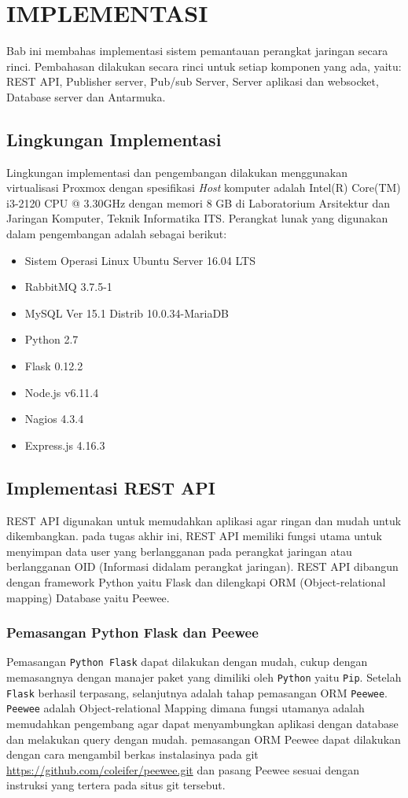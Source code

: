 \chapter{IMPLEMENTASI}
	Bab ini membahas implementasi sistem pemantauan perangkat jaringan secara rinci. Pembahasan dilakukan secara rinci untuk setiap komponen yang ada, yaitu: REST API, Publisher server, Pub/sub Server, Server aplikasi dan websocket, Database server dan Antarmuka.
    
    \section{Lingkungan Implementasi}
    	Lingkungan implementasi dan pengembangan dilakukan menggunakan virtualisasi Proxmox dengan spesifikasi \textit{Host} komputer adalah Intel(R) Core(TM) i3-2120 CPU @ 3.30GHz dengan memori 8 GB di Laboratorium Arsitektur dan Jaringan Komputer, Teknik Informatika ITS. Perangkat lunak yang digunakan dalam pengembangan adalah sebagai berikut:
        \begin{itemize}
        \item Sistem Operasi Linux Ubuntu Server 16.04 LTS
        \item RabbitMQ 3.7.5-1
        \item MySQL Ver 15.1 Distrib 10.0.34-MariaDB
        \item Python 2.7
        \item Flask 0.12.2
        \item Node.js v6.11.4
        \item Nagios 4.3.4
        \item Express.js 4.16.3
        \end{itemize}
        
	\section{Implementasi REST API}
    	REST API digunakan untuk memudahkan aplikasi agar ringan dan mudah untuk dikembangkan. pada tugas akhir ini, REST API memiliki fungsi utama untuk menyimpan data user yang berlangganan pada perangkat jaringan atau berlangganan OID (Informasi didalam perangkat jaringan). REST API dibangun dengan framework Python yaitu Flask dan dilengkapi ORM (Object-relational mapping) Database yaitu Peewee.
        \subsection{Pemasangan Python Flask dan Peewee}
        	Pemasangan \texttt{Python Flask} dapat dilakukan dengan mudah, cukup dengan memasangnya dengan manajer paket yang dimiliki oleh \texttt{Python} yaitu \texttt{Pip}. Setelah \texttt{Flask} berhasil terpasang, selanjutnya adalah tahap pemasangan ORM \texttt{Peewee}. \texttt{Peewee} adalah Object-relational Mapping dimana fungsi utamanya adalah memudahkan pengembang agar dapat menyambungkan aplikasi dengan database dan melakukan query dengan mudah. pemasangan ORM Peewee dapat dilakukan dengan cara mengambil berkas instalasinya pada git \url{https://github.com/coleifer/peewee.git} dan pasang Peewee sesuai dengan instruksi yang tertera pada situs git tersebut.
        	
